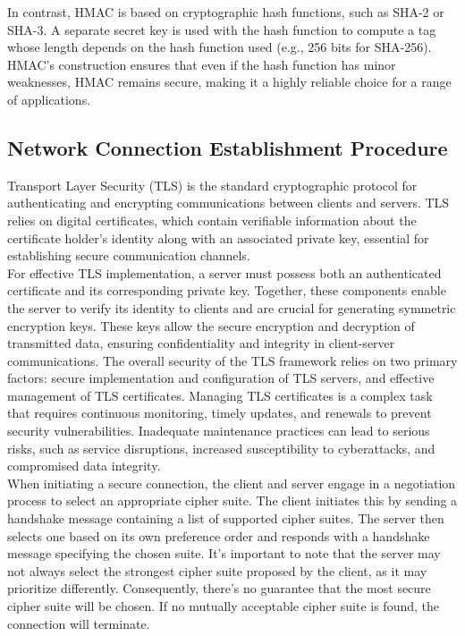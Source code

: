 \documentclass[pdflatex,sn-mathphys-num]{sn-jnl}%
\theoremstyle{thmstyleone}%
\theoremstyle{thmstyletwo}%
\theoremstyle{thmstylethree}%
\begin{document}
In contrast, HMAC is based on cryptographic hash functions, such as SHA-2 or SHA-3. A separate secret key is used with the hash function to compute a tag whose length depends on the hash function used (e.g., 256 bits for SHA-256). HMAC’s construction ensures that even if the hash function has minor weaknesses, HMAC remains secure, making it a highly reliable choice for a range of applications.


\subsection*{Network Connection Establishment Procedure}

Transport Layer Security (TLS) is the standard cryptographic protocol for authenticating and encrypting communications between clients and servers. TLS relies on digital certificates, which contain verifiable information about the certificate holder’s identity along with an associated private key, essential for establishing secure communication channels.\\

For effective TLS implementation, a server must possess both an authenticated certificate and its corresponding private key. Together, these components enable the server to verify its identity to clients and are crucial for generating symmetric encryption keys. These keys allow the secure encryption and decryption of transmitted data, ensuring confidentiality and integrity in client-server communications. The overall security of the TLS framework relies on two primary factors: secure implementation and configuration of TLS servers, and effective management of TLS certificates. Managing TLS certificates is a complex task that requires continuous monitoring, timely updates, and renewals to prevent security vulnerabilities. Inadequate maintenance practices can lead to serious risks, such as service disruptions, increased susceptibility to cyberattacks, and compromised data integrity.\\

When initiating a secure connection, the client and server engage in a negotiation process to select an appropriate cipher suite. The client initiates this by sending a handshake message containing a list of supported cipher suites. The server then selects one based on its own preference order and responds with a handshake message specifying the chosen suite. It’s important to note that the server may not always select the strongest cipher suite proposed by the client, as it may prioritize differently. Consequently, there’s no guarantee that the most secure cipher suite will be chosen. If no mutually acceptable cipher suite is found, the connection will terminate.\\
\end{document}
